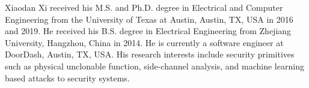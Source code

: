 \documentclass[9.5pt,journal,compsoc]{IEEEtran}
\begin{document}





\maketitle














\begin{IEEEbiography}%
{Xiaodan Xi}
received his M.S. and Ph.D. degree in Electrical and Computer Engineering from the University of Texas at Austin, Austin, TX, USA in 2016 and 2019. He received his B.S. degree in Electrical Engineering from Zhejiang University, Hangzhou, China in 2014. He is currently a software engineer at DoorDash, Austin, TX, USA. His research interests include security primitives such as physical unclonable function, side-channel analysis, and machine learning based attacks to security systems.
\end{IEEEbiography}
\end{document}
